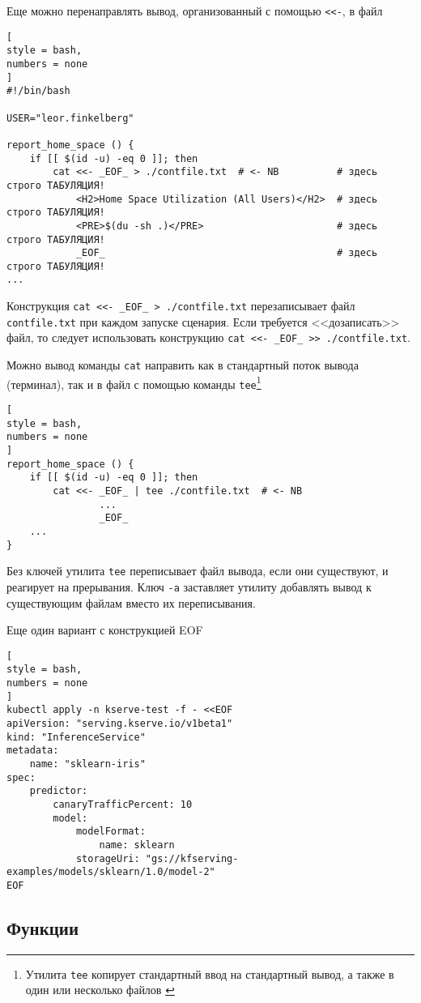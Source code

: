 \documentclass[%
	11pt,
	a4paper,
	utf8,
		]{article}
\begin{document}
Еще можно перенаправлять вывод, организованный с помощью \verb|<<-|, в файл
\begin{lstlisting}[
style = bash,
numbers = none
]
#!/bin/bash

USER="leor.finkelberg"

report_home_space () {
    if [[ $(id -u) -eq 0 ]]; then
        cat <<- _EOF_ > ./contfile.txt  # <- NB          # здесь строго ТАБУЛЯЦИЯ!
            <H2>Home Space Utilization (All Users)</H2>  # здесь строго ТАБУЛЯЦИЯ!
            <PRE>$(du -sh .)</PRE>                       # здесь строго ТАБУЛЯЦИЯ!
            _EOF_                                        # здесь строго ТАБУЛЯЦИЯ!
...
\end{lstlisting}

Конструкция \verb|cat <<- _EOF_ > ./contfile.txt| перезаписывает файл \texttt{contfile.txt} при каждом запуске сценария. Если требуется <<дозаписать>> файл, то следует использовать конструкцию \verb|cat <<- _EOF_ >> ./contfile.txt|.

Можно вывод команды \texttt{cat} направить как в стандартный поток вывода (терминал), так и в файл с помощью команды \texttt{tee}\footnote{Утилита \texttt{tee} копирует стандартный ввод на стандартный вывод, а также в один или несколько файлов \cite{sobel:linux-2011}}
\begin{lstlisting}[
style = bash,
numbers = none
]
report_home_space () {
    if [[ $(id -u) -eq 0 ]]; then
        cat <<- _EOF_ | tee ./contfile.txt  # <- NB
                ...
                _EOF_
    ...
}
\end{lstlisting}

Без ключей утилита \texttt{tee} переписывает файл вывода, если они существуют, и реагирует на прерывания. Ключ \verb|-a| заставляет утилиту добавлять вывод к существующим файлам вместо их переписывания.

Еще один вариант с конструкцией EOF
\begin{lstlisting}[
style = bash,
numbers = none
]
kubectl apply -n kserve-test -f - <<EOF
apiVersion: "serving.kserve.io/v1beta1"
kind: "InferenceService"
metadata:
	name: "sklearn-iris"
spec:
	predictor:
		canaryTrafficPercent: 10
		model:
			modelFormat:
				name: sklearn
			storageUri: "gs://kfserving-examples/models/sklearn/1.0/model-2"
EOF
\end{lstlisting}

\subsection{Функции}
\end{document}

